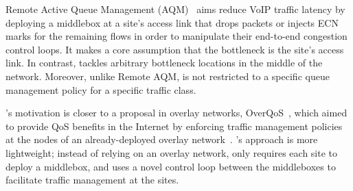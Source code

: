  Remote Active Queue Management (AQM)~\cite{ardelean} aims reduce VoIP traffic latency by deploying a middlebox at a site's access link that drops packets or injects ECN marks for the remaining flows in order to manipulate their end-to-end congestion control loops. It makes a core assumption that the bottleneck is the site's access link.
In contrast, \name tackles arbitrary bottleneck locations in the middle of the network. Moreover, unlike Remote AQM, \name is not restricted to a specific queue management policy for a specific traffic class.



 \name's motivation is closer to a proposal in overlay networks, OverQoS~\cite{overqos}, which aimed to provide QoS benefits in the Internet by enforcing traffic management policies at the nodes of an already-deployed overlay network~\cite{ron}. 
\name's approach is more lightweight; instead of relying on an overlay network, \name only requires each site to deploy a middlebox, and uses a novel control loop between the middleboxes to facilitate traffic management at the sites. 


